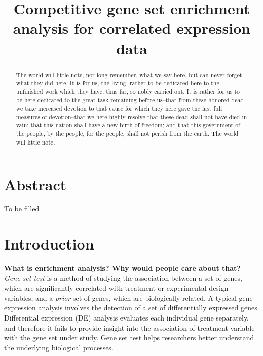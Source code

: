 \documentclass[11pt, a4paper]{article}
\title{Competitive gene set enrichment analysis for correlated expression data}
\date{} %
\begin{document}
	
	\begin{abstract}
		The world will little note, nor long remember, what we say here, but
		can never forget what they did here. It is for us, the living, rather
		to be dedicated here to the unfinished work which they have, thus far,
		so nobly carried out. It is rather for us to be here dedicated to the
		great task remaining before us--that from these honored dead we take
		increased devotion to that cause for which they here gave the last
		full measures of devotion--that we here highly resolve that these dead
		shall not have died in vain; that this nation shall have a new birth
		of freedom; and that this government of the people, by the people, for
		the people, shall not perish from the earth. The world will little
		note.
	\end{abstract}
	
	
	
	\maketitle


	
	\section*{Abstract}
	To be filled
	
	\section{Introduction}\label{section:introduction}
	
	\textbf{What is enrichment analysis? Why would people care about that?}\\
	 \textit{Gene set test} is a method of studying the association between a set of genes, which are significantly correlated with treatment or experimental design variables, and a \textit{prior} set of genes, which are biologically related. A typical gene expression analysis involves the detection of a set of differentially expressed genes. Differential expression (DE) analysis  evaluates each individual gene separately, and therefore it fails to provide insight into the association of treatment variable with the gene set under study. Gene set test helps researchers better understand the underlying biological processes.
	 
\end{document}

